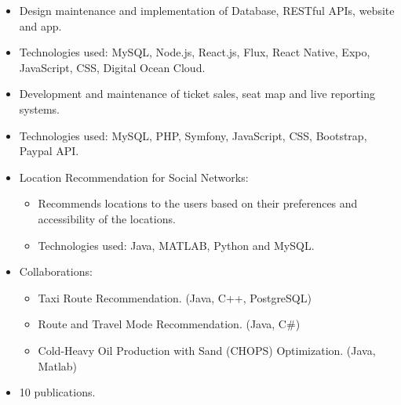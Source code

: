 \documentclass[10pt,a4paper,ragged2e,withhyper]{altacv}
\begin{document}
\begin{paracol}{2}
            \begin{itemize}
                \item Design maintenance and implementation of Database, RESTful APIs, website and app.
                \item Technologies used: MySQL, Node.js, React.js, Flux, React Native, Expo, JavaScript, CSS, Digital Ocean Cloud. 
            \end{itemize}
            \divider
            \begin{itemize}
                \item Development and maintenance of ticket sales, seat map and live reporting systems.
                \item
                Technologies used: MySQL, PHP, Symfony, JavaScript, CSS, Bootstrap, Paypal API.
            \end{itemize}
            \divider
            \begin{itemize}
                \item Location Recommendation for Social Networks:
                \begin{itemize}
                    \item Recommends locations to the users based on their preferences and accessibility of the locations.
                    \item Technologies used: Java, MATLAB, Python and MySQL.
                \end{itemize}
                \item Collaborations:
                \begin{itemize}
                    \item Taxi Route Recommendation. (Java, C++, PostgreSQL)
                    \item Route and Travel Mode Recommendation. (Java, C\#)
                    \item Cold-Heavy Oil Production with Sand (CHOPS) Optimization. (Java, Matlab)
                \end{itemize}
                \item 10 publications.
            \end{itemize}
        

\end{paracol}
\end{document}
